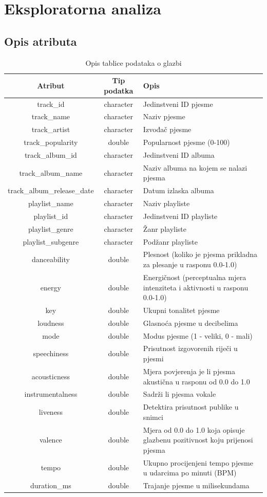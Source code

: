 \chapter{Eksploratorna analiza}

\section{Opis atributa}
\begin{table}[h]
	\centering
	\begin{tabular}{|c|c|p{8cm}|}
	\hline
	\textbf{Atribut} & \textbf{Tip podatka} & \textbf{Opis} \\ \hline
	track\_id & character & Jedinstveni ID pjesme \\ \hline
	track\_name & character & Naziv pjesme \\ \hline
	track\_artist & character & Izvođač pjesme \\ \hline
	track\_popularity & double & Popularnost pjesme (0-100) \\ \hline
	track\_album\_id & character & Jedinstveni ID albuma \\ \hline
	track\_album\_name & character & Naziv albuma na kojem se nalazi pjesma \\ \hline
	track\_album\_release\_date & character & Datum izlaska albuma \\ \hline
	playlist\_name & character & Naziv playliste \\ \hline
	playlist\_id & character & Jedinstveni ID playliste \\ \hline
	playlist\_genre & character & Žanr playliste \\ \hline
	playlist\_subgenre & character & Podžanr playliste \\ \hline
	danceability & double & Plesnost (koliko je pjesma prikladna za plesanje u rasponu 0.0-1.0) \\ \hline
	energy & double & Energičnost (perceptualna mjera intenziteta i aktivnosti u rasponu 0.0-1.0) \\ \hline
	key & double & Ukupni tonalitet pjesme \\ \hline
	loudness & double & Glasnoća pjesme u decibelima \\ \hline
	mode & double & Modus pjesme (1 - veliki, 0 - mali) \\ \hline
	speechiness & double & Prisutnost izgovorenih riječi u pjesmi \\ \hline
	acousticness & double & Mjera povjerenja je li pjesma akustična u rasponu od 0.0 do 1.0 \\ \hline
	instrumentalness & double & Sadrži li pjesma vokale \\ \hline
	liveness & double & Detektira prisutnost publike u snimci \\ \hline
	valence & double & Mjera od 0.0 do 1.0 koja opisuje glazbenu pozitivnost koju prijenosi pjesma \\ \hline
	tempo & double & Ukupno procijenjeni tempo pjesme u udarcima po minuti (BPM) \\ \hline
	duration\_ms & double & Trajanje pjesme u milisekundama \\ \hline
	\end{tabular}
	\caption{Opis tablice podataka o glazbi}
	\label{tab:glazba}
	\end{table}

